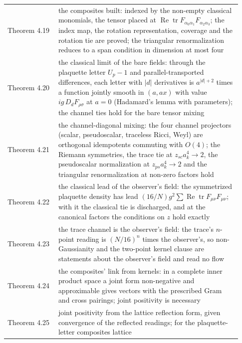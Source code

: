 \documentclass[10pt,letterpaper,twocolumn]{article}
\providecommand{\rm}{}\DeclareOldFontCommand{\rm}{\normalfont\rmfamily}{\mathrm}
\begin{document}
\begin{center}
{\footnotesize
{}
\tabletail{\midrule}
\tablelasttail{\bottomrule}
\begin{xtabular}{L{0.207\linewidth}L{0.724\linewidth}}
Theorem 4.19 & the composites built: indexed by the non-empty classical monomials, the
tensor placed at
\(\operatorname{Re}\operatorname{tr}F_{\alpha_0\alpha_1}F_{\alpha_2\alpha_3}\);
the index map, the rotation representation, coverage and the rotation
tie are proved; the triangular renormalization reduces to a span
condition in dimension at most four \\
Theorem 4.20 & the classical limit of the bare fields: through the plaquette letter
\(U_p-1\) and parallel-transported differences, each letter with
\(\lvert d\rvert\) derivatives is \(a^{\lvert d\rvert+2}\) times a
function jointly smooth in \((a,ax)\) with value
\(ig\,D_dF_{\rho\sigma}\) at \(a=0\) (Hadamard's lemma with parameters);
the channel ties hold for the bare tensor mixing \\
Theorem 4.21 & the channel-diagonal mixing: the four channel projectors (scalar,
pseudoscalar, traceless Ricci, Weyl) are orthogonal idempotents
commuting with \(O(4)\); the Riemann symmetries, the trace tie at
\(z_{\rm sc}a_k^4\to2\), the pseudoscalar normalization at
\(z_{\rm ps}a_k^4\to2\) and the triangular renormalization at non-zero
factors hold \\
Theorem 4.22 & the classical lead of the observer's field: the symmetrized plaquette
density has lead
\((16/N)g^2\sum\operatorname{Re}\operatorname{tr}F_{\mu\nu}F_{\mu\nu}\);
with it the classical tie is discharged, and at the canonical factors
the conditions on \(z\) hold exactly \\
Theorem 4.23 & the trace channel is the observer's field: the trace's \(n\)-point
reading is \((N/16)^n\) times the observer's, so non-Gaussianity and the
two-point kernel clause are statements about the observer's field and
read no flow \\
Theorem 4.24 & the composites' link from kernels: in a complete inner product space a
joint form non-negative and approximable gives vectors with the
prescribed Gram and cross pairings; joint positivity is necessary \\
Theorem 4.25 & joint positivity from the lattice reflection form, given convergence of
the reflected readings; for the plaquette-letter composites lattice

\end{xtabular}}
\end{center}
\end{document}
